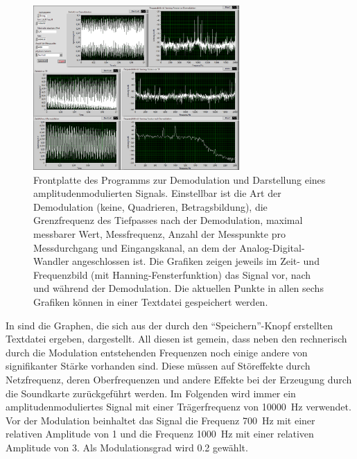 \documentclass[
a4paper,
12pt,
pagesize,
ngerman
]{scrartcl}
\begin{document}
	\begin{figure}[H]  
		\includegraphics[width=0.7\textwidth]{EIRE2018Dateien/Tag3/modifizierterOszi/Oszilloskop__modifiziertp}
		\centering
		\caption{
			Frontplatte des Programms zur Demodulation und Darstellung eines amplitudenmodulierten Signals.
			Einstellbar ist die Art der Demodulation (keine, Quadrieren, Betragsbildung), die Grenzfrequenz des Tiefpasses nach der Demodulation, maximal messbarer Wert, Messfrequenz, Anzahl der Messpunkte pro Messdurchgang und Eingangskanal, an dem der Analog-Digital-Wandler angeschlossen ist.
			Die Grafiken zeigen jeweils im Zeit- und Frequenzbild (mit Hanning-Fensterfunktion) das Signal vor, nach und während der Demodulation.
			Die aktuellen Punkte in allen sechs Grafiken können in einer Textdatei gespeichert werden.
		}
		\label{fig_tag3_am_demod_front}
		\centering
	\end{figure}

	In  sind die Graphen, die sich aus der durch den \enquote{Speichern}-Knopf erstellten Textdatei ergeben, dargestellt.
	All diesen ist gemein, dass neben den rechnerisch durch die Modulation entstehenden Frequenzen noch einige andere von signifikanter Stärke vorhanden sind.
	Diese müssen auf Störeffekte durch Netzfrequenz, deren Oberfrequenzen und andere Effekte bei der Erzeugung durch die Soundkarte zurückgeführt werden.
	Im Folgenden wird immer ein amplitudenmoduliertes Signal mit einer Trägerfrequenz von \SI{10000}{\hertz} verwendet.
	Vor der Modulation beinhaltet das Signal die Frequenz \SI{700}{\hertz} mit einer relativen Amplitude von \num{1} und die Frequenz \SI{1000}{\hertz} mit einer relativen Amplitude von \num{3}. %
	Als Modulationsgrad wird \num{0,2} gewählt.
\end{document}
